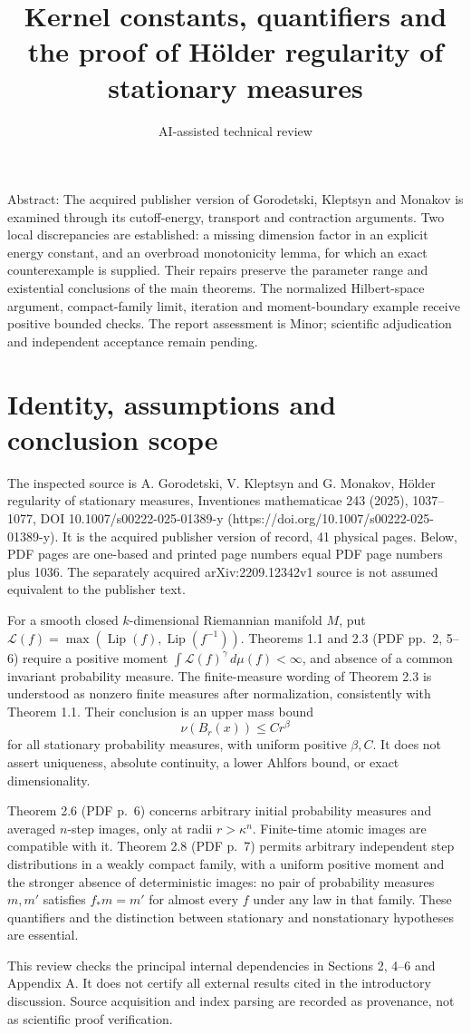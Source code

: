 \documentclass[10pt]{article}
\title{Kernel constants, quantifiers and the proof of Hölder regularity of stationary measures}
\author{AI-assisted technical review}
\date{}
\begin{document}
\maketitle
Abstract: The acquired publisher version of Gorodetski, Kleptsyn and Monakov is examined through its cutoff-energy, transport and contraction arguments. Two local discrepancies are established: a missing dimension factor in an explicit energy constant, and an overbroad monotonicity lemma, for which an exact counterexample is supplied. Their repairs preserve the parameter range and existential conclusions of the main theorems. The normalized Hilbert-space argument, compact-family limit, iteration and moment-boundary example receive positive bounded checks. The report assessment is Minor; scientific adjudication and independent acceptance remain pending.\par
\section*{Identity, assumptions and conclusion scope}
The inspected source is A. Gorodetski, V. Kleptsyn and G. Monakov, Hölder regularity of stationary measures, Inventiones mathematicae 243 (2025), 1037–1077, DOI 10.1007/s00222-025-01389-y (https://doi.org/10.1007/s00222-025-01389-y). It is the acquired publisher version of record, 41 physical pages. Below, PDF pages are one-based and printed page numbers equal PDF page numbers plus 1036. The separately acquired arXiv:2209.12342v1 source is not assumed equivalent to the publisher text.\par
For a smooth closed \(k\)-dimensional Riemannian manifold \(M\), put \(\mathcal L(f)=\max(\operatorname{Lip}(f),\operatorname{Lip}(f^{-1}))\). Theorems 1.1 and 2.3 (PDF pp. 2, 5–6) require a positive moment \(\int\mathcal L(f)^\gamma\,d\mu(f)<\infty\), and absence of a common invariant probability measure. The finite-measure wording of Theorem 2.3 is understood as nonzero finite measures after normalization, consistently with Theorem 1.1. Their conclusion is an upper mass bound \[\nu(B_r(x))\le C r^\beta\] for all stationary probability measures, with uniform positive \(\beta,C\). It does not assert uniqueness, absolute continuity, a lower Ahlfors bound, or exact dimensionality.\par
Theorem 2.6 (PDF p. 6) concerns arbitrary initial probability measures and averaged \(n\)-step images, only at radii \(r>\kappa^n\). Finite-time atomic images are compatible with it. Theorem 2.8 (PDF p. 7) permits arbitrary independent step distributions in a weakly compact family, with a uniform positive moment and the stronger absence of deterministic images: no pair of probability measures \(m,m'\) satisfies \(f_*m=m'\) for almost every \(f\) under any law in that family. These quantifiers and the distinction between stationary and nonstationary hypotheses are essential.\par
This review checks the principal internal dependencies in Sections 2, 4–6 and Appendix A. It does not certify all external results cited in the introductory discussion. Source acquisition and index parsing are recorded as provenance, not as scientific proof verification.\par
\end{document}
